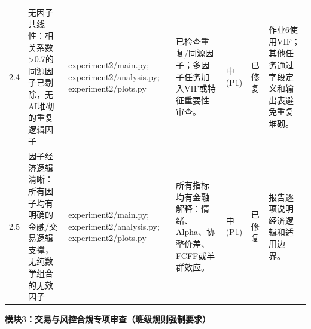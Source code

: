 \begin{longtable}{@{}L{0.045\textwidth}L{0.190\textwidth}L{0.140\textwidth}L{0.190\textwidth}L{0.060\textwidth}L{0.060\textwidth}L{0.205\textwidth}@{}}
2.4 & 无因子共线性：相关系数\textgreater0.7的同源因子已剔除，无AI堆砌的重复逻辑因子 & experiment2/\allowbreak{}main.py;\allowbreak{} experiment2/\allowbreak{}analysis.py;\allowbreak{} experiment2/\allowbreak{}plots.py & 已检查重复/\allowbreak{}同源因子；多因子任务加入VIF或特征重要性审查。 & 中(P1) & 已修复 & 作业6使用VIF；其他任务通过字段定义和输出表避免重复堆砌。 \\
2.5 & 因子经济逻辑清晰：所有因子均有明确的金融/\allowbreak{}交易逻辑支撑，无纯数学组合的无效因子 & experiment2/\allowbreak{}main.py;\allowbreak{} experiment2/\allowbreak{}analysis.py;\allowbreak{} experiment2/\allowbreak{}plots.py & 所有指标均有金融解释：情绪、Alpha、协整价差、FCFF或羊群效应。 & 中(P1) & 已修复 & 报告逐项说明经济逻辑和适用边界。 \\
\end{longtable}
\endgroup

\textbf{模块3：交易与风控合规专项审查（班级规则强制要求）}


